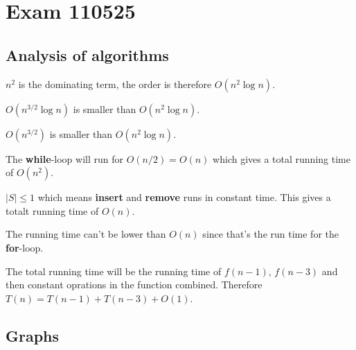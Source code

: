\documentclass[a4paper]{article}
\newenvironment{task}[1]
{
	\begin{description}[align=right]
		\item [#1]
}{		%
	\end{description}
}
\newcommand{\abs}[1]{\left|#1\right|}
\DeclareMathOperator{\*}{\cdot}
\begin{document}
\pagebreak
\section*{Exam 110525}
\subsection*{Analysis of algorithms}

\begin{task}{1. (a)}
	 $n^2$ is the dominating term, the order is therefore $O(n^2\log n)$.
\end{task}

\begin{task}{(b)}
	 $O(n^{3/2}\log n)$ is smaller than $O(n^2\log n)$.
\end{task}

\begin{task}{(c)}
	 $O(n^{3/2})$ is smaller than $O(n^2\log n)$.
\end{task}

\begin{task}{2. (a)}
	 The \textbf{while}-loop will run for $O(n/2)=O(n)$ which gives a total running time of $O(n^2)$.
\end{task}

\begin{task}{3. (a)}
	 $\abs{S}\leq 1$ which means \textbf{insert} and \textbf{remove} runs in constant time. This gives a totalt running time of $O(n)$.
\end{task}

\begin{task}{(b)}
	 The running time can't be lower than $O(n)$ since that's the run time for the \textbf{for}-loop. 
\end{task}

\begin{task}{4. (a)}
	 The total running time will be the running time of $f(n-1)$, $f(n-3)$ and then constant oprations in the function combined. Therefore $T(n)=T(n-1)+T(n-3)+O(1)$.
\end{task}

\begin{task}{(b)}
\end{task}

\subsection*{Graphs}
\end{document}
